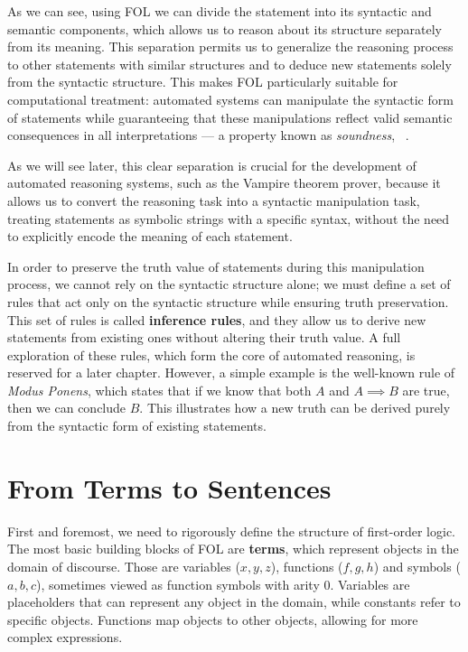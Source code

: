 As we can see, using FOL we can divide the statement into its syntactic and semantic components, which allows us to reason about its structure separately from its meaning.
This separation permits us to generalize the reasoning process to other statements with similar structures and to deduce new statements solely from the syntactic structure.
This makes FOL particularly suitable for computational treatment: automated systems can manipulate the syntactic form of statements while guaranteeing that these manipulations reflect valid semantic consequences in all interpretations — a property known as \textit{soundness}, \citeauthor{enderton2001}~\cite{enderton2001}.

As we will see later, this clear separation is crucial for the development of automated reasoning systems, such as the Vampire theorem prover, because it allows us to convert the reasoning task into a syntactic manipulation task, treating statements as symbolic strings with a specific syntax, without the need to explicitly encode the meaning of each statement.

In order to preserve the truth value of statements during this manipulation process, we cannot rely on the syntactic structure alone; we must define a set of rules that act only on the syntactic structure while ensuring truth preservation.
This set of rules is called \textbf{inference rules}, and they allow us to derive new statements from existing ones without altering their truth value.
A full exploration of these rules, which form the core of automated reasoning, is reserved for a later chapter. However, a simple example is the well-known rule of \textit{Modus Ponens}, which states that if we know that both \(A\) and \(A\implies B\) are true, then we can conclude \(B\). This illustrates how a new truth can be derived purely from the syntactic form of existing statements.

\section{From Terms to Sentences}

First and foremost, we need to rigorously define the structure of first-order logic.
The most basic building blocks of FOL are \textbf{terms}, which represent objects in the domain of discourse.
Those are variables (\(x,y,z\)), functions (\(f,g,h\)) and  symbols (\(a,b,c\)), sometimes viewed as function symbols with arity 0.
Variables are placeholders that can represent any object in the domain, while constants refer to specific objects. Functions map objects to other objects, allowing for more complex expressions.

